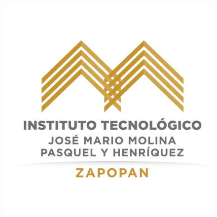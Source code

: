 \documentclass[12pt,titlepage]{article}
\begin{document}
\setlength{\parindent}{1.1cm} %
\setcounter{tocdepth}{4}
\setcounter{secnumdepth}{4}
\renewcommand{\labelitemi}{$\cdot$} %

\begin{titlepage} %

\begin{center} %
\begin{figure}[htbp]
\hspace*{2.0cm} 
\includegraphics[scale=0.39]{Tec_logo}
\end{figure}


\end{center}
\end{titlepage}
\end{document}
